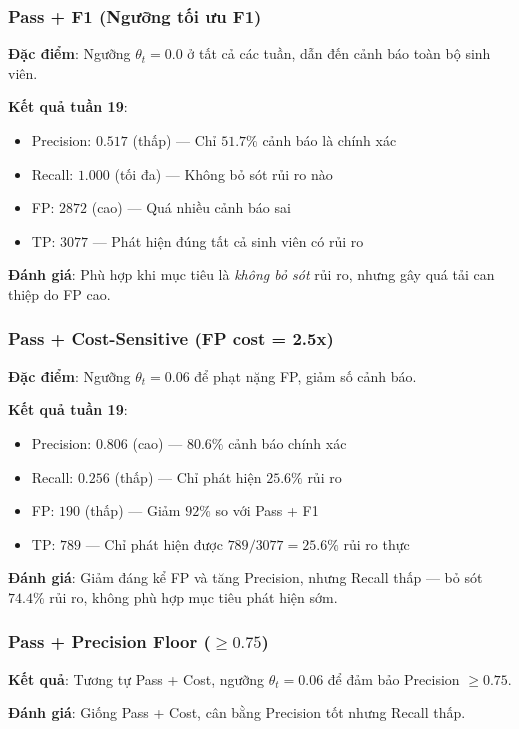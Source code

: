 \documentclass[12pt,a4paper]{article}
\begin{document}
\subsubsection{Pass + F1 (Ngưỡng tối ưu F1)}
\textbf{Đặc điểm}: Ngưỡng $\theta_t = 0.0$ ở tất cả các tuần, dẫn đến cảnh báo toàn bộ sinh viên.

\textbf{Kết quả tuần 19}:
\begin{itemize}
    \item Precision: $0.517$ (thấp) --- Chỉ $51.7\%$ cảnh báo là chính xác
    \item Recall: $1.000$ (tối đa) --- Không bỏ sót rủi ro nào
    \item FP: $2872$ (cao) --- Quá nhiều cảnh báo sai
    \item TP: $3077$ --- Phát hiện đúng tất cả sinh viên có rủi ro
\end{itemize}

\textbf{Đánh giá}: Phù hợp khi mục tiêu là \emph{không bỏ sót} rủi ro, nhưng gây quá tải can thiệp do FP cao.

\subsubsection{Pass + Cost-Sensitive (FP cost = 2.5x)}
\textbf{Đặc điểm}: Ngưỡng $\theta_t = 0.06$ để phạt nặng FP, giảm số cảnh báo.

\textbf{Kết quả tuần 19}:
\begin{itemize}
    \item Precision: $0.806$ (cao) --- $80.6\%$ cảnh báo chính xác
    \item Recall: $0.256$ (thấp) --- Chỉ phát hiện $25.6\%$ rủi ro
    \item FP: $190$ (thấp) --- Giảm $92\%$ so với Pass + F1
    \item TP: $789$ --- Chỉ phát hiện được $789/3077 = 25.6\%$ rủi ro thực
\end{itemize}

\textbf{Đánh giá}: Giảm đáng kể FP và tăng Precision, nhưng Recall thấp --- bỏ sót $74.4\%$ rủi ro, không phù hợp mục tiêu phát hiện sớm.

\subsubsection{Pass + Precision Floor ($\geq 0.75$)}
\textbf{Kết quả}: Tương tự Pass + Cost, ngưỡng $\theta_t = 0.06$ để đảm bảo Precision $\geq 0.75$.

\textbf{Đánh giá}: Giống Pass + Cost, cân bằng Precision tốt nhưng Recall thấp.
\end{document}
